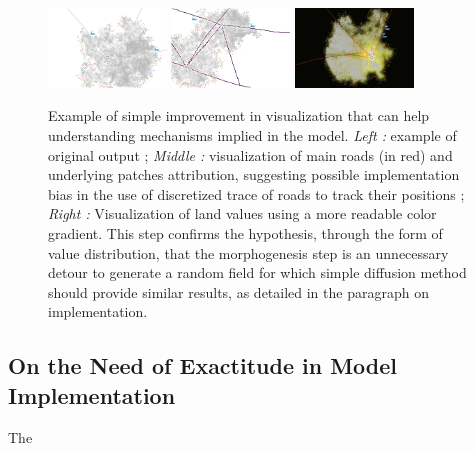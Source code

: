 \begin{figure}
\centering
\includegraphics[width=0.28\textwidth]{Figures/PartI/Methodology/Reproducibility/stdView}
\hfill
\includegraphics[width=0.28\textwidth]{Figures/PartI/Methodology/Reproducibility/ViewRoads}
\hfill
\includegraphics[width=0.28\textwidth]{Figures/PartI/Methodology/Reproducibility/landValues_cityFinished}
\caption[Reproducibility and explicit processes visualization]{Example of simple improvement in visualization that can help understanding mechanisms implied in the model. \textit{Left : } example of original output ; \textit{Middle : } visualization of main roads (in red) and underlying patches attribution, suggesting possible implementation bias in the use of discretized trace of roads to track their positions ; \textit{Right : }Visualization of land values using a more readable color gradient. This step confirms the hypothesis, through the form of value distribution, that the morphogenesis step is an unnecessary detour to generate a random field for which simple diffusion method should provide similar results, as detailed in the paragraph on implementation.}
\label{fig:example_tij_viz}
\end{figure}




\subsection{On the Need of Exactitude in Model Implementation}


The 













